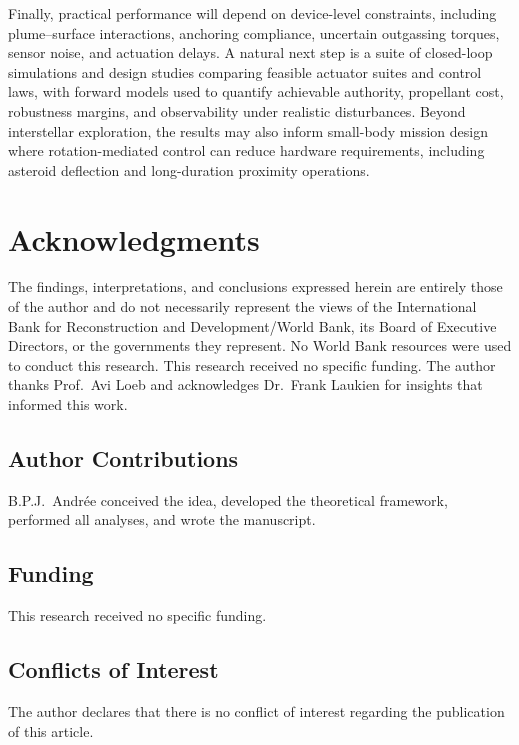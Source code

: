 \documentclass{article}
\begin{document}
Finally, practical performance will depend on device-level constraints, including plume--surface interactions, anchoring compliance, uncertain outgassing torques, sensor noise, and actuation delays. A natural next step is a suite of closed-loop simulations and design studies comparing feasible actuator suites and control laws, with forward models used to quantify achievable authority, propellant cost, robustness margins, and observability under realistic disturbances. Beyond interstellar exploration, the results may also inform small-body mission design where rotation-mediated control can reduce hardware requirements, including asteroid deflection and long-duration proximity operations.


\section*{Acknowledgments}

The findings, interpretations, and conclusions expressed herein are entirely those of the author and do not necessarily represent the views of the International Bank for Reconstruction and Development/World Bank, its Board of Executive Directors, or the governments they represent. No World Bank resources were used to conduct this research. This research received no specific funding. The author thanks Prof.\ Avi Loeb and acknowledges Dr.\ Frank Laukien for insights that informed this work.

\subsection*{Author Contributions}
B.P.J.\ Andr\'ee conceived the idea, developed the theoretical framework, performed all analyses, and wrote the manuscript.

\subsection*{Funding}
This research received no specific funding.

\subsection*{Conflicts of Interest}
The author declares that there is no conflict of interest regarding the publication of this article.
\end{document}
